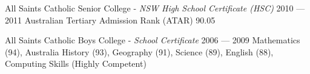 \begin{education}
  \eduitem
  {All Saints Catholic Senior College - \emph{NSW High School Certificate (HSC)}} %
  {2010 --- 2011} %
  {Australian Tertiary Admission Rank (ATAR) 90.05} %

  \eduitem
  {All Saints Catholic Boys College - \emph{School Certificate}} %
  {2006 --- 2009} %
  {Mathematics (94), Australia History (93), Geography (91), Science (89), English (88), Computing Skills (Highly Competent)} %


\end{education}
